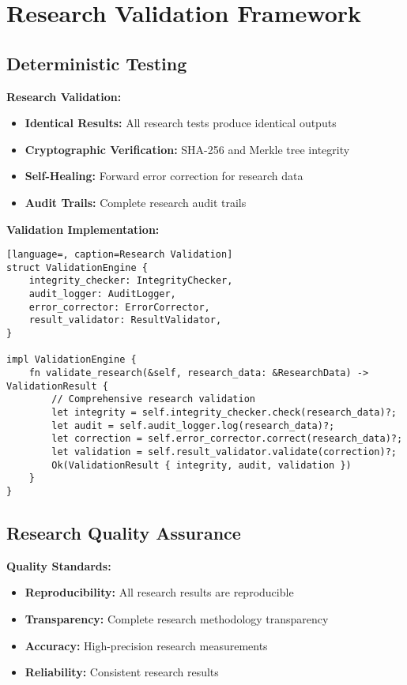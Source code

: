 \documentclass[12pt,a4paper]{article}
\begin{document}
\section{Research Validation Framework}

\subsection{Deterministic Testing}

\textbf{Research Validation:}
\begin{itemize}
    \item \textbf{Identical Results:} All research tests produce identical outputs
    \item \textbf{Cryptographic Verification:} SHA-256 and Merkle tree integrity
    \item \textbf{Self-Healing:} Forward error correction for research data
    \item \textbf{Audit Trails:} Complete research audit trails
\end{itemize}

\textbf{Validation Implementation:}
\begin{lstlisting}[language=, caption=Research Validation]
struct ValidationEngine {
    integrity_checker: IntegrityChecker,
    audit_logger: AuditLogger,
    error_corrector: ErrorCorrector,
    result_validator: ResultValidator,
}

impl ValidationEngine {
    fn validate_research(&self, research_data: &ResearchData) -> ValidationResult {
        // Comprehensive research validation
        let integrity = self.integrity_checker.check(research_data)?;
        let audit = self.audit_logger.log(research_data)?;
        let correction = self.error_corrector.correct(research_data)?;
        let validation = self.result_validator.validate(correction)?;
        Ok(ValidationResult { integrity, audit, validation })
    }
}
\end{lstlisting}

\subsection{Research Quality Assurance}

\textbf{Quality Standards:}
\begin{itemize}
    \item \textbf{Reproducibility:} All research results are reproducible
    \item \textbf{Transparency:} Complete research methodology transparency
    \item \textbf{Accuracy:} High-precision research measurements
    \item \textbf{Reliability:} Consistent research results
\end{itemize}
\end{document}
